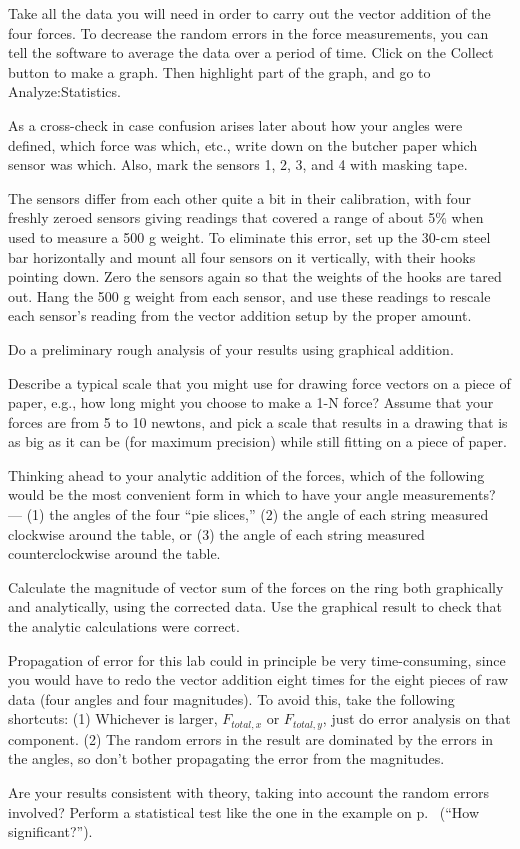 Take all the data you will need in order to carry out the vector addition of the four forces.
To decrease the random errors in the force measurements, you can tell the software to average
the data over a period of time. Click on the Collect button to make a graph.
Then highlight part of the graph, and go to Analyze:Statistics.

As a cross-check in case confusion arises later about how your angles were defined, which
force was which, etc., write down on the butcher paper which sensor was which.
Also, 
mark the sensors 1, 2, 3, and 4 with masking tape.

The sensors differ from each other quite a bit in their
calibration, with four freshly zeroed sensors giving readings
that covered a range of about 5\% when used to measure a 500 g weight.
To eliminate this error, set up the 30-cm steel bar
horizontally and mount all four sensors on it vertically, with their hooks pointing down.
Zero the sensors again so that the weights of the hooks are tared out.
Hang the 500 g weight from each sensor, and use these readings to
rescale each sensor's reading from the vector addition setup by the proper amount.

\selfcheck

Do a preliminary rough analysis of your results using graphical addition.

\prelab

\prelabquestion  Describe a typical scale that you might use for drawing
force vectors on a piece of paper, e.g., how long might you
choose to make a 1-N force?  Assume that your forces are
from 5 to 10 newtons, and pick a scale that results in a drawing that
is as big as it can be (for maximum precision) while still fitting on
a piece of paper.

\prelabquestion Thinking ahead to your analytic addition of the forces,
which of the following would be the most convenient form in which to have
your angle measurements? --- (1) the angles of the four ``pie slices,''
(2) the angle of each string measured clockwise around the table,
or (3) the angle of each string measured counterclockwise around the table.

\analysis

Calculate the magnitude of vector sum of the forces on the
ring both graphically and analytically, using the corrected data. Use the
graphical result to check that the analytic calculations were correct.

Propagation of error for this lab could in principle be very time-consuming,
since you would have to redo the vector addition eight times for the eight
pieces of raw data (four angles and four magnitudes). 
To avoid this, take the following shortcuts: (1) Whichever is larger,
$F_{total,x}$ or $F_{total,y}$, just do error analysis on that component.
(2) The random errors in the result are dominated by the errors in the angles,
so don't bother propagating the error from the magnitudes.

Are your results consistent with theory, taking into account
the random errors involved? Perform a statistical test like the
one in the example on p.~\pageref{eg:fine-structure} (``How significant?'').
